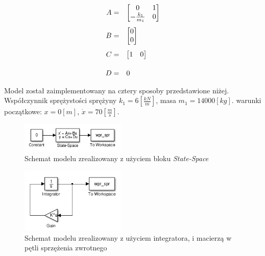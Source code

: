 \documentclass[12pt]{article}
\begin{document}
\begin{equation*}
	\begin{array}{r l}
		A = &
		\begin{bmatrix}
			0 & 1 \\
			-\frac{k_1}{m_1} & 0
		\end{bmatrix} \\[0.5cm]
		B = &
		\begin{bmatrix}
			0 \\
			0
		\end{bmatrix} \\[0.5cm]
		C = &
		\begin{bmatrix}
			1 & 0 \\
		\end{bmatrix} \\[0.5cm]
		D = & 0 \\
	\end{array}
\end{equation*}

Model został zaimplementowany na cztery sposoby przedstawione niżej.
Współczynnik sprężystości sprężyny $k_1 = 6[\frac{kN}{m}]$, masa
$m_1 = 14000[kg]$. warunki początkowe: $x = 0[m]$, $\dot{x} = 70[\frac{m}{s}]$.

\newpage

\begin{figure}[!htb]
	\begin{center}
		\includegraphics[width=5cm]{../res/img/wpr_sprA_mdl.png}
	\end{center}
	\caption{Schemat modelu zrealizowany z użyciem bloku \textit{State-Space}}
	\label{rys:sch_wpr_mdlA}
\end{figure}

\begin{figure}[!htb]
	\begin{center}
		\includegraphics[width=5cm]{../res/img/wpr_sprB_mdl.png}
	\end{center}
	\caption{Schemat modelu zrealizowany z użyciem integratora, i macierzą w pętli
	sprzężenia zwrotnego}
	\label{rys:sch_wpr_mdlB}
\end{figure}
\end{document}
